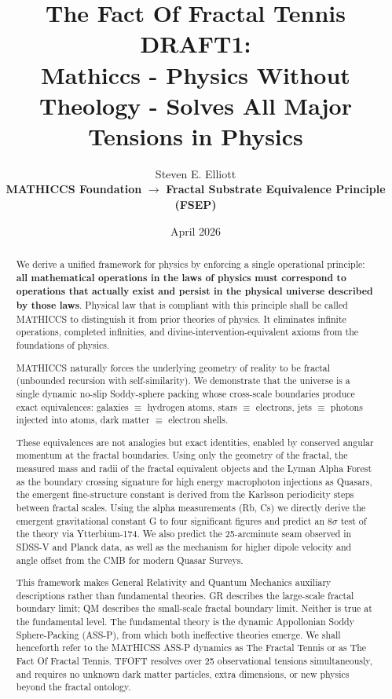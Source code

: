 \documentclass[11pt,a4paper]{article}
\title{The Fact Of Fractal Tennis DRAFT1: \\ Mathiccs - Physics Without Theology - Solves All Major Tensions in Physics }
\author{Steven E. Elliott \\ \textbf{MATHICCS Foundation} $\to$ \textbf{Fractal Substrate Equivalence Principle (FSEP)}}
\date{April 2026}
\begin{document}
\maketitle

\begin{abstract}
We derive a unified framework for physics by enforcing a single operational principle: \textbf{all mathematical operations in the laws of physics must correspond to operations that actually exist and persist in the physical universe described by those laws}. Physical law that is compliant with this principle shall be called MATHICCS to distinguish it from prior theories of physics. It eliminates infinite operations, completed infinities, and divine-intervention-equivalent axioms from the foundations of physics. 

MATHICCS naturally forces the underlying geometry of reality to be fractal (unbounded recursion with self-similarity). We demonstrate that the universe is a single dynamic no-slip Soddy-sphere packing whose cross-scale boundaries produce exact equivalences: galaxies $\equiv$ hydrogen atoms, stars $\equiv$ electrons, jets $\equiv$ photons injected into atoms, dark matter $\equiv$ electron shells.

These equivalences are not analogies but exact identities, enabled by conserved angular momentum at the fractal boundaries. Using only the geometry of the fractal, the measured mass and radii of the fractal equivalent objects and the Lyman Alpha Forest as the boundary crossing signature for high energy macrophoton injections as Quasars, the emergent fine-structure constant is derived from the Karlsson periodicity steps between fractal scales. Using the alpha measurements (Rb, Cs) we directly derive the emergent gravitational constant G to four significant figures and predict an 8$\sigma$ test of the theory via Ytterbium-174. We also predict the 25-arcminute seam observed in SDSS-V and Planck data, as well as the mechanism for higher dipole velocity and angle offset from the CMB for modern Quasar Surveys.

This framework makes General Relativity and Quantum Mechanics auxiliary descriptions rather than fundamental theories. GR describes the large-scale fractal boundary limit; QM describes the small-scale fractal boundary limit. Neither is true at the fundamental level. The fundamental theory is the dynamic Appollonian Soddy Sphere-Packing (ASS-P), from which both ineffective theories emerge. We shall henceforth refer to the MATHICSS ASS-P dynamics as The Fractal Tennis or as The Fact Of Fractal Tennis. TFOFT resolves over 25 observational tensions simultaneously, and requires no unknown dark matter particles, extra dimensions, or new physics beyond the fractal ontology.

\end{abstract}
\end{document}
